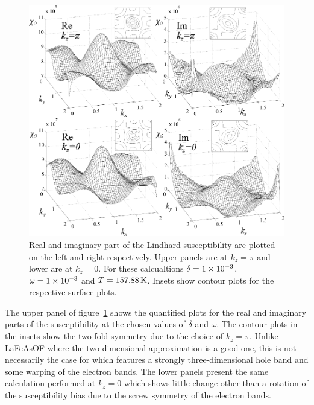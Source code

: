 \begin{figure}[htbp]
    \begin{center}
        \includegraphics[scale=0.9]{Chapter-dHvABaFe2P2/Figures/Susceptibility/2DSusceptibility/2DSusceptibilityPlusAltKz}
        \caption{Real and imaginary part of the Lindhard susceptibility are plotted on the left and right respectively. Upper panels are at $k_z=\pi$ and lower are at $k_z=0$. For these calcualtions $\delta=1\times 10^{-3}$, $\omega=1\times 10^{-3}$ and $T=\unit[157.88]{K}$. Insets show contour plots for the respective surface plots.}
        \label{Fig:ResD:2DSusceptibility}
    \end{center}
\end{figure}
The upper panel of figure~\ref{Fig:ResD:2DSusceptibility} shows the quantified plots for the real and imaginary parts of the susceptibility at the chosen values of $\delta$ and $\omega$. The contour plots in the insets show the two-fold symmetry due to the choice of $k_z=\pi$. Unlike LaFeAsOF where the two dimensional approximation is a good one, this is not necessarily the case for \BaFeP which features a strongly three-dimensional hole band and some warping of the electron bands. The lower panels present the same calculation performed at $k_z=0$ which shows little change other than a rotation of the susceptibility bias due to the screw symmetry of the electron bands.
